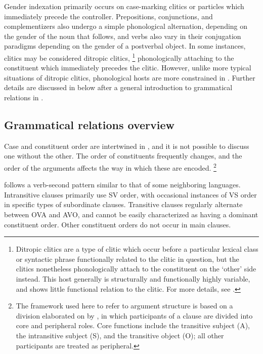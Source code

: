 \documentclass[output=collectionpaper,hidelinks]{langscibook}
\theoremstyle{remark}
\begin{document}
Gender indexation primarily occurs on case-marking clitics or particles which
immediately precede the controller.  Prepositions, conjunctions, and
complementizers also undergo a simple phonological alternation, depending on the
gender of the noun that follows, and verbs also vary in their conjugation
paradigms depending on the gender of a postverbal object.  In some instances,
clitics may be considered ditropic clitics,%
\footnote{Ditropic clitics are a type of clitic which occur before a particular
lexical class or syntactic phrase functionally related to the clitic in
question, but the clitics nonetheless phonologically attach to the constituent
on the `other' side instead.  This host generally is structurally and
functionally highly variable, and shows little functional relation to the
clitic.  For more details, see \citet{Cysouw_Enclitics_2005}.} %
phonologically attaching to the constituent which immediately precedes the
clitic.  However, unlike more typical situations of ditropic clitics,
phonological hosts are more constrained in .  Further details are discussed
in  below after a general introduction to
grammatical relations in .


\subsection{Grammatical relations overview}
\label{sec:Don:Grammatical_relations_overview}

Case and constituent order are intertwined in , and it is not possible to
discuss one without the other. The order of constituents frequently changes,
and the order of the arguments affects the way in which these are
encoded.%
\footnote{The framework used here to refer to argument structure is based
on a division elaborated on by \citet{Dixon_1994}, in which participants of a
clause are divided into core and peripheral roles. Core functions include the
transitive subject (A), the intransitive subject (S), and the transitive object
(O); all other participants are treated as peripheral.}

 follows a verb-second pattern similar to that of some neighboring 
languages. Intransitive clauses primarily use SV order, with occasional
instances of VS order in specific types of subordinate clauses. Transitive
clauses regularly alternate between OVA and AVO, and cannot be easily
characterized as having a dominant constituent order. Other constituent orders
do not occur in main clauses.
\end{document}
